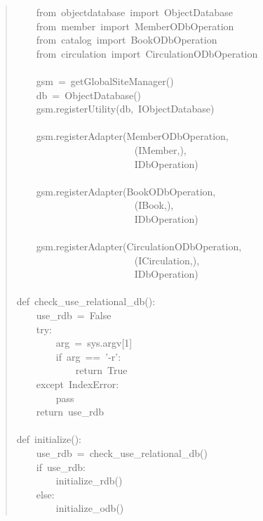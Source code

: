 \documentclass[a4paper,openany,twoside,final]{book}
\begin{document}
\begin{quote}
{~~~~from~objectdatabase~import~ObjectDatabase\\
~~~~from~member~import~MemberODbOperation\\
~~~~from~catalog~import~BookODbOperation\\
~~~~from~circulation~import~CirculationODbOperation\\
~\\
~~~~gsm~=~getGlobalSiteManager()\\
~~~~db~=~ObjectDatabase()\\
~~~~gsm.registerUtility(db,~IObjectDatabase)\\
~\\
~~~~gsm.registerAdapter(MemberODbOperation,\\
~~~~~~~~~~~~~~~~~~~~~~~~(IMember,),\\
~~~~~~~~~~~~~~~~~~~~~~~~IDbOperation)\\
~\\
~~~~gsm.registerAdapter(BookODbOperation,\\
~~~~~~~~~~~~~~~~~~~~~~~~(IBook,),\\
~~~~~~~~~~~~~~~~~~~~~~~~IDbOperation)\\
~\\
~~~~gsm.registerAdapter(CirculationODbOperation,\\
~~~~~~~~~~~~~~~~~~~~~~~~(ICirculation,),\\
~~~~~~~~~~~~~~~~~~~~~~~~IDbOperation)\\
~\\
def~check\_use\_relational\_db():\\
~~~~use\_rdb~=~False\\
~~~~try:\\
~~~~~~~~arg~=~sys.argv{[}1{]}\\
~~~~~~~~if~arg~==~'-r':\\
~~~~~~~~~~~~return~True\\
~~~~except~IndexError:\\
~~~~~~~~pass\\
~~~~return~use\_rdb\\
~\\
def~initialize():\\
~~~~use\_rdb~=~check\_use\_relational\_db()\\
~~~~if~use\_rdb:\\
~~~~~~~~initialize\_rdb()\\
~~~~else:\\
~~~~~~~~initialize\_odb()
}
\end{quote}
\end{document}
